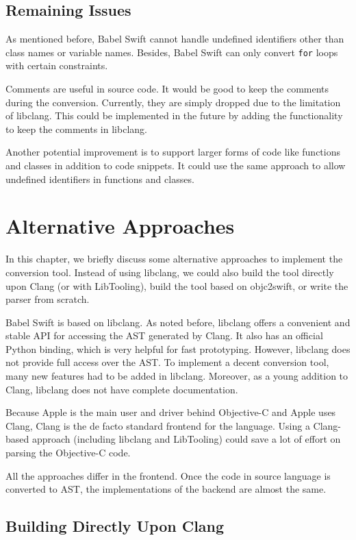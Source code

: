 \documentclass{sfuthesis}
\begin{document}
\section{Remaining Issues}

As mentioned before, Babel Swift cannot handle undefined identifiers other than class names or variable names. Besides, Babel Swift can only convert \texttt{for} loops with certain constraints.

Comments are useful in source code. It would be good to keep the comments during the conversion. Currently, they are simply dropped due to the limitation of libclang. This could be implemented in the future by adding the functionality to keep the comments in libclang.

Another potential improvement is to support larger forms of code like functions and classes in addition to code snippets. It could use the same approach to allow undefined identifiers in functions and classes.

\chapter{Alternative Approaches}

In this chapter, we briefly discuss some alternative approaches to implement the conversion tool. Instead of using libclang, we could also build the tool directly upon Clang (or with LibTooling), build the tool based on objc2swift, or write the parser from scratch.

Babel Swift is based on libclang. As noted before, libclang offers a convenient and stable API for accessing the AST generated by Clang. It also has an official Python binding, which is very helpful for fast prototyping. However, libclang does not provide full access over the AST. To implement a decent conversion tool, many new features had to be added in libclang. Moreover, as a young addition to Clang, libclang does not have complete documentation.

Because Apple is the main user and driver behind Objective-C and Apple uses Clang, Clang is the de facto standard frontend for the language. Using a Clang-based approach (including libclang and LibTooling) could save a lot of effort on parsing the Objective-C code.

All the approaches differ in the frontend. Once the code in source language is converted to AST, the implementations of the backend are almost the same.

\section{Building Directly Upon Clang}
\end{document}
